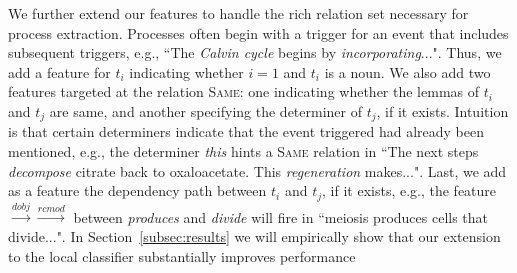 
We further extend our features to handle the rich relation set necessary for process extraction. Processes often begin with a trigger for an event that includes subsequent triggers, e.g., ``The \emph{Calvin cycle} begins by \emph{incorporating}...". Thus, we add a feature for $t_i$ indicating whether $i=1$ and $t_i$  is a noun. We also add two features targeted at the relation \textsc{Same}: one indicating whether the lemmas of $t_i$ and $t_j$ are same, and another specifying the determiner of $t_j$, if it exists. Intuition is that certain determiners indicate that the event triggered had already been mentioned, e.g., the determiner \emph{this} hints a \textsc{Same} relation in ``The next steps \emph{decompose} citrate back to oxaloacetate. This \emph{regeneration} makes...". Last, we add as a feature the dependency path between $t_i$ and $t_j$, if it exists, e.g., the feature $\xrightarrow{\scriptscriptstyle dobj} \xrightarrow{\scriptscriptstyle rcmod}$ between \emph{produces} and \emph{divide} will fire in ``meiosis produces cells that divide...". In Section~\ref{subsec:results} we will empirically show that our extension to the local classifier substantially improves performance


